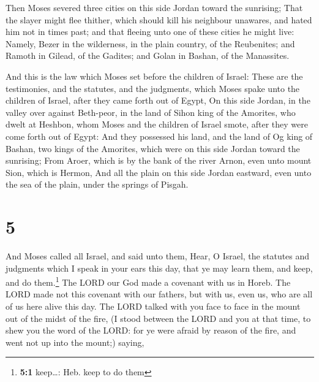  Then Moses severed three cities on this side Jordan
toward the sunrising;  That the slayer might flee
thither, which should kill his neighbour unawares, and hated him not in
times past; and that fleeing unto one of these cities he might live:
 Namely, Bezer in the wilderness, in the plain country,
of the Reubenites; and Ramoth in Gilead, of the Gadites; and Golan in
Bashan, of the Manassites.

 And this is the law which Moses set before the children
of Israel:  These are the testimonies, and the statutes,
and the judgments, which Moses spake unto the children of Israel, after
they came forth out of Egypt,  On this side Jordan, in
the valley over against Beth-peor, in the land of Sihon king of the
Amorites, who dwelt at Heshbon, whom Moses and the children of Israel
smote, after they were come forth out of Egypt:  And they
possessed his land, and the land of Og king of Bashan, two kings of the
Amorites, which were on this side Jordan toward the sunrising;
 From Aroer, which is by the bank of the river Arnon,
even unto mount Sion, which is Hermon,  And all the plain
on this side Jordan eastward, even unto the sea of the plain, under the
springs of Pisgah.

\hypertarget{section-4}{%
\section{5}\label{section-4}}

 And Moses called all Israel, and said unto them, Hear, O
Israel, the statutes and judgments which I speak in your ears this day,
that ye may learn them, and keep, and do them.\footnote{\textbf{5:1}
  keep\ldots: Heb. keep to do them}  The LORD our God made
a covenant with us in Horeb.  The LORD made not this
covenant with our fathers, but with us, even us, who are all of us here
alive this day.  The LORD talked with you face to face in
the mount out of the midst of the fire,  (I stood between
the LORD and you at that time, to shew you the word of the LORD: for ye
were afraid by reason of the fire, and went not up into the mount;)
saying,

